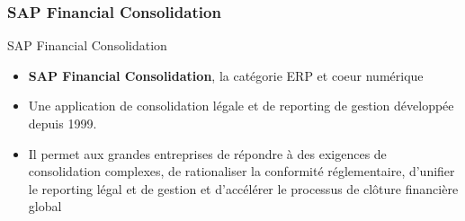 \documentclass{beamer}
\begin{document}
        \begin{frame}[t]
            \frametitle{SAP Financial Consolidation}
            \begin{block}{SAP Financial Consolidation}
            \begin{itemize}
                \item \textbf{SAP Financial Consolidation}, la catégorie ERP et coeur numérique
                \item Une application de consolidation légale et de reporting de gestion développée depuis 1999.
                \item Il permet aux grandes entreprises de répondre à des exigences de consolidation complexes, de rationaliser la conformité réglementaire, d’unifier le reporting légal et de gestion et d’accélérer le processus de clôture financière global
            \end{itemize}
            
            \end{block}
        \end{frame}
        
\end{document}
